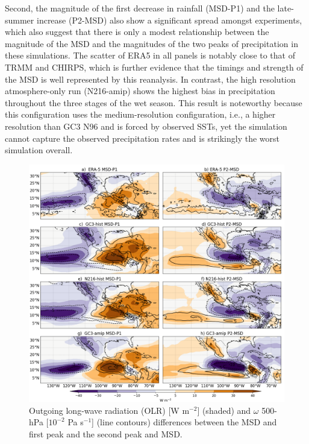  
Second, the magnitude of the first decrease in rainfall (MSD-P1) and the late-summer increase (P2-MSD) also show a significant spread amongst experiments, which also suggest that there is only a modest relationship between the magnitude of the MSD and the magnitudes of the two peaks of precipitation in these simulations. The scatter of ERA5 in all panels is notably close to that of TRMM and CHIRPS, which is further evidence that the timings and strength of the MSD is well represented by this reanalysis. In contrast, the high resolution atmosphere-only run (N216-amip) shows the highest bias in precipitation throughout the three stages of the wet season. This result is noteworthy because this configuration uses the medium-resolution configuration, i.e., a higher resolution than GC3 N96 and is forced by observed SSTs, yet the simulation cannot capture the observed precipitation rates and is strikingly the worst simulation overall. %


 \begin{figure}[t!]
\includegraphics[width=\linewidth]{figures/fig4_olrv_3.png}
\caption[OLR and vertical velocity composites]{Outgoing long-wave radiation (OLR) [W m$^{-2}$] (shaded) and $\omega$ 500-hPa [$10^{-2}$ Pa s$^{-1}$] (line contours) differences between the MSD and first peak and the second peak and MSD.}
\label{fig:olranom}
\end{figure}

